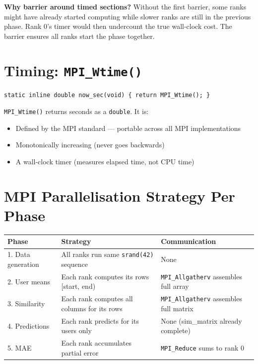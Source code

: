 \documentclass[12pt,a4paper]{article}
\begin{document}
\textbf{Why barrier around timed sections?}  Without the first barrier, some
ranks might have already started computing while slower ranks are still in
the previous phase.  Rank 0's timer would then undercount the true wall-clock
cost.  The barrier ensures all ranks start the phase together.

\section{Timing: \texttt{MPI\_Wtime()}}

\begin{lstlisting}
static inline double now_sec(void) { return MPI_Wtime(); }
\end{lstlisting}

\texttt{MPI\_Wtime()} returns seconds as a \texttt{double}.  It is:
\begin{itemize}
    \item Defined by the MPI standard — portable across all MPI implementations
    \item Monotonically increasing (never goes backwards)
    \item A wall-clock timer (measures elapsed time, not CPU time)
\end{itemize}

\section{MPI Parallelisation Strategy Per Phase}

\begin{center}
\begin{tabular}{lll}
\toprule
Phase & Strategy & Communication \\
\midrule
1. Data generation &
  All ranks run same \texttt{srand(42)} sequence &
  None \\
2. User means &
  Each rank computes its rows [start, end) &
  \texttt{MPI\_Allgatherv} assembles full array \\
3. Similarity &
  Each rank computes all columns for its rows &
  \texttt{MPI\_Allgatherv} assembles full matrix \\
4. Predictions &
  Each rank predicts for its users only &
  None (sim\_matrix already complete) \\
5. MAE &
  Each rank accumulates partial error &
  \texttt{MPI\_Reduce} sums to rank 0 \\
\bottomrule
\end{tabular}
\end{center}
\end{document}
